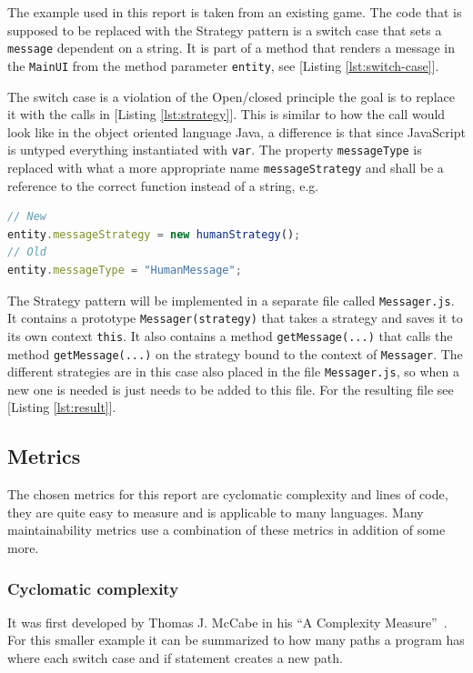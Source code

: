 \documentclass[conference, a4paper]{IEEEtran}
\begin{document}
The example used in this report is taken from an existing game. The code that is supposed to be replaced with the Strategy pattern is a switch case that sets a \texttt{message} dependent on a string. It is part of a method that renders a message in the \texttt{MainUI} from the method parameter \texttt{entity}, see [Listing \ref{lst:switch-case}].

The switch case is a violation of the Open/closed principle the goal is to replace it with the calls in [Listing \ref{lst:strategy}]. This is similar to how the call would look like in the object oriented language Java, a difference is that since JavaScript is untyped everything instantiated with \texttt{var}. The property \texttt{messageType} is replaced with what a more appropriate name \texttt{messageStrategy} and shall be a reference to the correct function instead of a string, e.g.

\begin{lstlisting}[language=JavaScript]
// New
entity.messageStrategy = new humanStrategy();
// Old
entity.messageType = "HumanMessage";
\end{lstlisting}

The Strategy pattern will be implemented in a separate file called \texttt{Messager.js}. It contains a prototype \texttt{Messager(strategy)} that takes a strategy and saves it to its own context \texttt{this}. It also contains a method \texttt{getMessage(...)} that calls the method \texttt{getMessage(...)} on the strategy bound to the context of \texttt{Messager}. The different strategies are in this case also placed in the file \texttt{Messager.js}, so when a new one is needed is just needs to be added to this file. For the resulting file see [Listing \ref{lst:result}].

\subsection{Metrics}
The chosen metrics for this report are cyclomatic complexity and lines of code, they are quite easy to measure and is applicable to many languages. Many maintainability metrics use a combination of these metrics in addition of some more.

\subsubsection{Cyclomatic complexity}
It was first developed by Thomas J. McCabe in his ``A Complexity Measure''~\cite{bibitem:CC}. For this smaller example it can be summarized to how many paths a program has where each switch case and if statement creates a new path.
\end{document}
